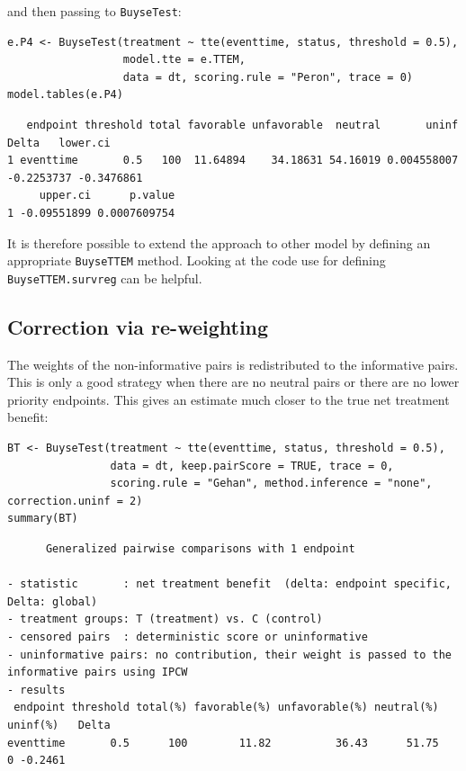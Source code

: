 \documentclass[12pt]{article}
\begin{document}
and then passing to \texttt{BuyseTest}:
\lstset{language=r,label= ,caption= ,captionpos=b,numbers=none}
\begin{lstlisting}
e.P4 <- BuyseTest(treatment ~ tte(eventtime, status, threshold = 0.5),
                  model.tte = e.TTEM,
                  data = dt, scoring.rule = "Peron", trace = 0)
model.tables(e.P4)
\end{lstlisting}

\begin{verbatim}
   endpoint threshold total favorable unfavorable  neutral       uninf      Delta   lower.ci
1 eventtime       0.5   100  11.64894    34.18631 54.16019 0.004558007 -0.2253737 -0.3476861
     upper.ci      p.value
1 -0.09551899 0.0007609754
\end{verbatim}


It is therefore possible to extend the approach to other model by
defining an appropriate \texttt{BuyseTTEM} method. Looking at the code use
for defining \texttt{BuyseTTEM.survreg} can be helpful.

\subsection{Correction via re-weighting}
\label{sec:org623d860}

The weights of the non-informative pairs is redistributed
to the informative pairs. This is only a good strategy when there are
no neutral pairs or there are no lower priority endpoints. This gives
an estimate much closer to the true net treatment benefit:
\lstset{language=r,label= ,caption= ,captionpos=b,numbers=none}
\begin{lstlisting}
BT <- BuyseTest(treatment ~ tte(eventtime, status, threshold = 0.5),
                data = dt, keep.pairScore = TRUE, trace = 0,
                scoring.rule = "Gehan", method.inference = "none", correction.uninf = 2)
summary(BT)
\end{lstlisting}

\begin{verbatim}
      Generalized pairwise comparisons with 1 endpoint

- statistic       : net treatment benefit  (delta: endpoint specific, Delta: global) 
- treatment groups: T (treatment) vs. C (control) 
- censored pairs  : deterministic score or uninformative
- uninformative pairs: no contribution, their weight is passed to the informative pairs using IPCW
- results
 endpoint threshold total(%) favorable(%) unfavorable(%) neutral(%) uninf(%)   Delta
eventtime       0.5      100        11.82          36.43      51.75        0 -0.2461
\end{verbatim}
\end{document}

